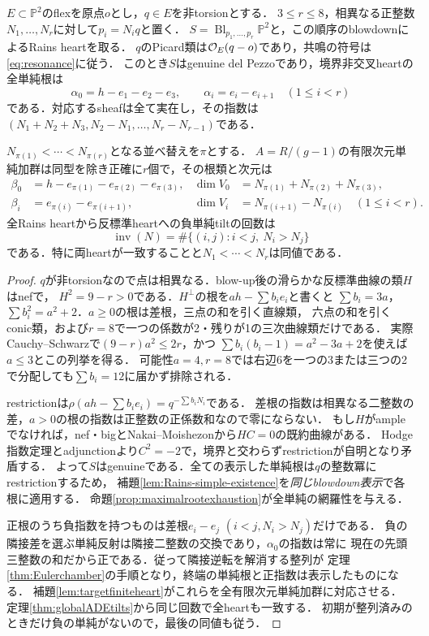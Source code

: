 \begin{theorem}\label{thm:sorted-spectrum}
$E\subset\mathbb P^2$のflexを原点$o$とし，$q\in E$を非torsionとする．
$3\le r\le8$，相異なる正整数$N_1,\ldots,N_r$に対して$p_i=N_iq$と置く．
$S=\operatorname{Bl}_{p_1,\ldots,p_r}\mathbb P^2$と，この順序のblowdownによるRains heartを取る．
$q$のPicard類は$\mathcal O_E(q-o)$であり，共鳴の符号は\eqref{eq:resonance}に従う．
このとき$S$はgenuine del Pezzoであり，境界非交叉heartの全単純根は
\[
 \alpha_0=h-e_1-e_2-e_3,\qquad \alpha_i=e_i-e_{i+1}\quad(1\le i<r)
\]
である．対応するsheafは全て実在し，その指数は
$(N_1+N_2+N_3,N_2-N_1,\ldots,N_r-N_{r-1})$である．

$N_{\pi(1)}<\cdots<N_{\pi(r)}$となる並べ替えを$\pi$とする．
$A=R/(g-1)$の有限次元単純加群は同型を除き正確に$r$個で，その根類と次元は
\begin{align*}
 \beta_0&=h-e_{\pi(1)}-e_{\pi(2)}-e_{\pi(3)},
 &\dim V_0&=N_{\pi(1)}+N_{\pi(2)}+N_{\pi(3)},\\
 \beta_i&=e_{\pi(i)}-e_{\pi(i+1)},
 &\dim V_i&=N_{\pi(i+1)}-N_{\pi(i)}\quad(1\le i<r).
\end{align*}
全Rains heartから反標準heartへの負単純tiltの回数は
\[
 \operatorname{inv}(N)=\#\{(i,j):i<j,\ N_i>N_j\}
\]
である．特に両heartが一致することと$N_1<\cdots<N_r$は同値である．
\end{theorem}
\begin{proof}
$q$が非torsionなので点は相異なる．blow-up後の滑らかな反標準曲線の類$H$はnefで，
$H^2=9-r>0$である．$H^\perp$の根を$ah-\sum b_ie_i$と書くと
$\sum b_i=3a$，$\sum b_i^2=a^2+2$．$a\ge0$の根は差根，三点の和を引く直線類，
六点の和を引くconic類，および$r=8$で一つの係数が2・残りが1の三次曲線類だけである．
実際Cauchy--Schwarzで$(9-r)a^2\le2r$，かつ
$\sum b_i(b_i-1)=a^2-3a+2$を使えば$a\le3$とこの列挙を得る．
可能性$a=4,r=8$では右辺6を一つの3または三つの2で分配しても$\sum b_i=12$に届かず排除される．

restrictionは$\rho(ah-\sum b_ie_i)=q^{-\sum b_iN_i}$である．
差根の指数は相異なる二整数の差，$a>0$の根の指数は正整数の正係数和なので零にならない．
もし$H$がampleでなければ，nef・bigとNakai--Moishezonから$HC=0$の既約曲線がある．
Hodge指数定理とadjunctionより$C^2=-2$で，境界と交わらずrestrictionが自明となり矛盾する．
よって$S$はgenuineである．全ての表示した単純根は$q$の整数冪にrestrictionするため，
補題\ref{lem:Rains-simple-existence}を\emph{同じblowdown表示}で各根に適用する．
命題\ref{prop:maximalrootexhaustion}が全単純の網羅性を与える．

正根のうち負指数を持つものは差根$e_i-e_j$ $(i<j,N_i>N_j)$だけである．
負の隣接差を選ぶ単純反射は隣接二整数の交換であり，$\alpha_0$の指数は常に
現在の先頭三整数の和だから正である．従って隣接逆転を解消する整列が
定理\ref{thm:Eulerchamber}の手順となり，終端の単純根と正指数は表示したものになる．
補題\ref{lem:targetfiniteheart}がこれらを全有限次元単純加群に対応させる．
定理\ref{thm:globalADEtilts}から同じ回数で全heartも一致する．
初期が整列済みのときだけ負の単純がないので，最後の同値も従う．
\end{proof}

